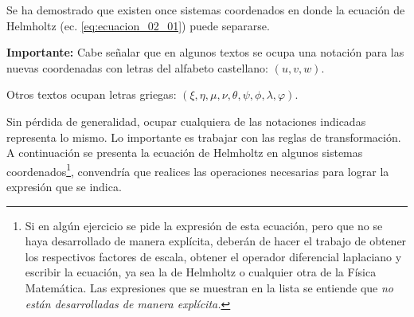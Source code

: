 Se ha demostrado que existen once sistemas coordenados en donde la ecuación de Helmholtz  (ec. \ref{eq:ecuacion_02_01}) puede separarse. 
\par
\textbf{Importante: } Cabe señalar que en algunos textos se ocupa una notación para las nuevas coordenadas con letras del alfabeto castellano: $(u, v, w)$.
\par
Otros textos ocupan letras griegas: $(\xi, \eta, \mu, \nu, \theta, \psi, \phi, \lambda, \varphi)$.
\par
Sin pérdida de generalidad, ocupar cualquiera de las notaciones indicadas representa lo mismo. Lo importante es trabajar con las reglas de transformación. A continuación se presenta la ecuación de Helmholtz en algunos sistemas coordenados\footnote{Si en algún ejercicio se pide la expresión de esta ecuación, pero que no se haya desarrollado de manera explícita, deberán de hacer el trabajo de obtener los respectivos factores de escala, obtener el operador diferencial laplaciano y escribir la ecuación, ya sea la de Helmholtz o cualquier otra de la Física Matemática. Las expresiones que se muestran en la lista se entiende que \emph{no están desarrolladas de manera explícita.}}, convendría que realices las operaciones necesarias para lograr la expresión que se indica.
\par
